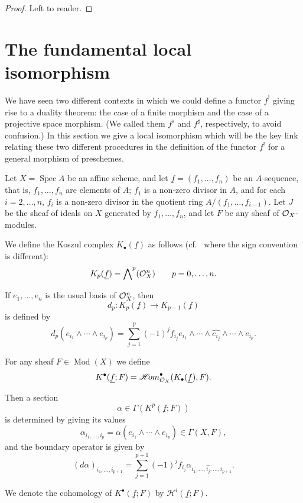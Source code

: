 \begin{proof}
Left to reader.
\end{proof}
\section{The fundamental local isomorphism}\label{sec:3.7}

We have seen two different contexts in which we could define a functor $f^!$ giving rise to a duality theorem: the case of a finite morphism and the case of a projective space morphism. (We called them $f^{\flat}$ and $f^{\sharp}$, respectively, to avoid confusion.) In this section we give a local isomorphism which will be the key link relating these two different procedures in the definition of the functor $f^!$ for a general morphism of preschemes.

Let $X=\operatorname{Spec}A$ be an affine scheme, and let $\underline{f}=(f_1,\dots,f_n)$ be an $A$-sequence, that is, $f_1,\dots,f_n$ are elements of $A$; $f_1$ is a non-zero divisor in $A$, and for each $i=2,\dots,n$, $f_i$ is a non-zero divisor in the quotient ring $A/(f_1,\dots,f_{i-1})$. Let $J$ be the sheaf of ideals on $X$ generated by $f_1,\dots,f_n$, and let $F$ be any sheaf of $\mathcal{O}_X$-modules.

We define the Koszul complex $K_\bullet(\underline{f})$ as follows (cf.\ \cite[\nopp III,~1.1]{EGA} where the sign convention is different):
\[
K_p(\underline{f}) = \bigwedge\nolimits^p (\mathcal{O}_X^n) \qquad p=0,\dots,n.
\]

If $e_1,\dots,e_n$ is the usual basis of $\mathcal{O}_X^n$, then
\[
d_p\colon K_p(\underline{f}) \longrightarrow K_{p-1}(\underline{f})
\]
is defined by
\[
d_p(e_{i_1}\wedge\cdots\wedge e_{i_p}) = \sum_{j=1}^p (-1)^j f_{i_j} e_{i_1}\wedge\cdots\wedge\widehat{e_{i_j}}\wedge\cdots\wedge e_{i_p}.
\]

For any sheaf $F\in\operatorname{Mod}(X)$ we define
\[
K^\bullet(\underline{f};F) = \mathop{\mathscr{H}\!om}\nolimits^\bullet_{\mathcal{O}_X}(K_\bullet(\underline{f}), F).
\]

Then a section
\[
\alpha \in \Gamma(K^p(\underline{f};F))
\]
is determined by giving its values
\[
\alpha_{i_1,\dots,i_p} = \alpha(e_{i_1}\wedge\cdots\wedge e_{i_p}) \in \Gamma(X,F),
\]
and the boundary operator is given by
\[
(d\alpha)_{i_1,\dots,i_{p+1}} = \sum_{j=1}^{p+1} (-1)^j f_{i_j} \alpha_{i_1,\dots,\widehat{i_j},\dots,i_{p+1}}.
\]

We denote the cohomology of $K^\bullet(\underline{f};F)$ by $\mathcal{H}^i(\underline{f};F)$.

